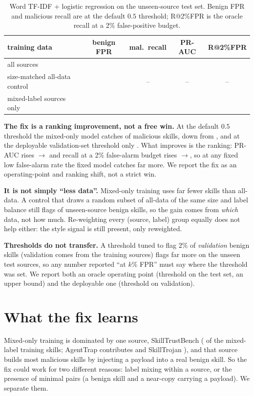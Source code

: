\begin{table}[t]
\caption{Word TF-IDF + logistic regression on the unseen-source test set. Benign FPR and malicious
recall are at the default $0.5$ threshold; R@2\%FPR is the oracle recall at a 2\% false-positive budget.}
\label{tab:fix}
\centering
\begin{tabular}{lcccc}
\toprule
training data & benign FPR & mal.\ recall & PR-AUC & R@2\%FPR \\
\midrule
all sources & \FprAll{} & \RecallAll{} & \PrAll{} & \RecallAtTwoAll{} \\
size-matched all-data control & \FprSizeMatched{} & -- & -- & -- \\
mixed-label sources only & \FprMixed{} & \RecallMixed{} & \PrMixed{} & \RecallAtTwoMixed{} \\
\bottomrule
\end{tabular}
\end{table}

\textbf{The fix is a ranking improvement, not a free win.} At the default $0.5$ threshold the mixed-only
model catches \RecallMixed{} of malicious skills, down from \RecallAll{}, and at the deployable
validation-set threshold only \RecallMixedDeploy{}. What improves is the ranking: PR-AUC rises
\PrAll{}$\to$\PrMixed{} and recall at a 2\% false-alarm budget rises \RecallAtTwoAll{}$\to$\RecallAtTwoMixed{}, so
at any fixed low false-alarm rate the fixed model catches far more. We report the fix as an operating-point
and ranking shift, not a strict win.

\textbf{It is not simply ``less data''.} Mixed-only training uses far fewer skills than all-data. A
control that draws a random subset of all-data of the same size and label balance still flags
\FprSizeMatched{} of unseen-source benign skills, so the gain comes from \emph{which} data, not how
much. Re-weighting every (source, label) group equally does not help either: the style signal is
still present, only reweighted.

\textbf{Thresholds do not transfer.} A threshold tuned to flag 2\% of \emph{validation} benign skills
(validation comes from the training sources) flags far more on the unseen test sources, so any number
reported ``at $k\%$ FPR'' must say where the threshold was set. We report both an oracle operating
point (threshold on the test set, an upper bound) and the deployable one (threshold on validation).

\section{What the fix learns}
\label{sec:mechanism}
Mixed-only training is dominated by one source, SkillTrustBench (\MixedSkillTrustBench{} of the
mixed-label training skills; AgentTrap contributes \MixedAgentTrap{} and SkillTrojan
\MixedSkillTrojan{}), and that source builds most malicious skills by injecting a payload into a real
benign skill. So the fix could work for two different reasons: label mixing within a source, or the
presence of minimal pairs (a benign skill and a near-copy carrying a payload). We separate them.


